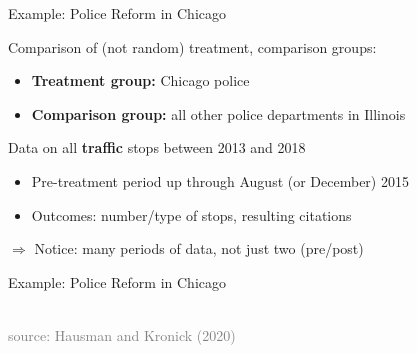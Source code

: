 \documentclass[10pt,xcolor=table,ignorenonframetext,aspectratio=169]{beamer}
\newlength{\wideitemsep}
\let\olditem\item
\renewcommand{\item}{\setlength{\itemsep}{\wideitemsep}\olditem}
\begin{document}

\begin{frame}{Example: Police Reform in Chicago}

\medskip
Comparison of (not random) treatment, comparison groups:

\medskip
\begin{itemize}
	
	\item \textbf{Treatment group:}  Chicago police
	
	\item \textbf{Comparison group:}  all other police departments in Illinois
	
\end{itemize}

\medskip
\medskip
Data on all \textbf{traffic} stops between 2013 and 2018

\medskip
\begin{itemize}
	
	\item Pre-treatment period up through August (or December) 2015
	
	\item Outcomes:  number/type of stops, resulting citations
	
\end{itemize}

\pause
\medskip
\medskip
$\Rightarrow$ Notice:  many periods of data, not just two (pre/post)



\end{frame}



\begin{frame}{Example: Police Reform in Chicago}

\medskip
\begin{center}
	\\
	\textcolor{gray}{\tiny{source:  Hausman and Kronick (2020)}}
\end{center}

\end{frame}
\end{document}
